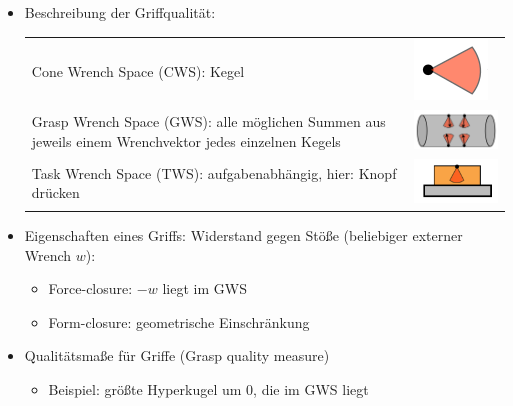 \begin{itemize}
\item Beschreibung der Griffqualität:\\
\begin{tabular}{p{12cm}p{3cm}}
Cone Wrench Space (CWS): Kegel & \includegraphics[width=.5\linewidth]{figures/ch04_cws.png}\\ 
Grasp Wrench Space (GWS): alle möglichen Summen aus jeweils einem Wrenchvektor jedes einzelnen Kegels & \includegraphics[width=.5\linewidth]{figures/ch04_gws.png}\\
Task Wrench Space (TWS): aufgabenabhängig, hier: Knopf drücken & \includegraphics[width=.5\linewidth]{figures/ch04_tws.png}
\end{tabular}
\item Eigenschaften eines Griffs: Widerstand gegen Stöße (beliebiger externer Wrench $w$):
\begin{itemize}
\item Force-closure: $-w$ liegt im GWS
\item Form-closure: geometrische Einschränkung
\end{itemize}
\item Qualitätsmaße für Griffe (Grasp quality measure)
\begin{itemize}
\item Beispiel: größte Hyperkugel um 0, die im GWS liegt
\end{itemize}
\end{itemize}
